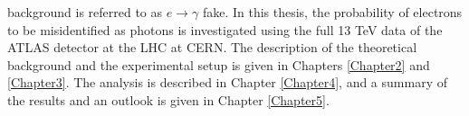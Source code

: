 background is referred to as $e\rightarrow\gamma$ fake. In this thesis, the probability of electrons to be misidentified as photons is investigated using the full 13 TeV data of the ATLAS detector at the LHC at CERN. The description of the theoretical background and the experimental setup is given in Chapters \ref{Chapter2} and \ref{Chapter3}. The analysis is described in Chapter \ref{Chapter4}, and a summary of the results and an outlook is given in Chapter \ref{Chapter5}.
